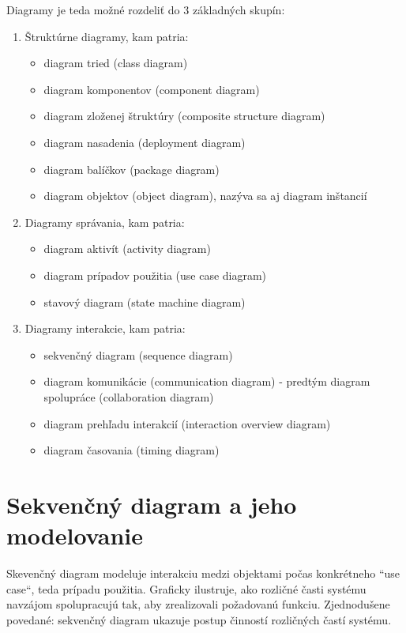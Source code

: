 \documentclass[10pt,twoside,slovak,a4paper]{article}
\begin{document}
 Diagramy je teda možné rozdeliť do 3 základných skupín\cite{WIKI}:

\begin{enumerate}
\item Štruktúrne diagramy, kam patria:
	\begin{itemize}
	\item diagram tried (class diagram)
	\item diagram komponentov (component diagram)
	\item diagram zloženej štruktúry (composite structure diagram)
	\item diagram nasadenia (deployment diagram)
	\item diagram balíčkov (package diagram)
	\item diagram objektov (object diagram), nazýva sa aj diagram inštancií
	\end{itemize}
\item Diagramy správania, kam patria:
	\begin{itemize}
	\item diagram aktivít (activity diagram)
	\item diagram prípadov použitia (use case diagram)
	\item stavový diagram (state machine diagram)
	\end{itemize}
\newpage
\item Diagramy interakcie, kam patria:
	\begin{itemize}
	\item sekvenčný diagram (sequence diagram)
	\item diagram komunikácie (communication diagram) - predtým diagram spolupráce (collaboration diagram)
	\item diagram prehľadu interakcií (interaction overview diagram)
	\item diagram časovania (timing diagram)
	\end{itemize}
\end{enumerate}



\section{Sekvenčný diagram a jeho modelovanie} \label{3sek}

Skevenčný diagram modeluje interakciu medzi objektami počas konkrétneho ``use case“, teda prípadu použitia. Graficky ilustruje, ako rozličné časti systému navzájom spolupracujú tak, aby zrealizovali požadovanú funkciu. Zjednodušene povedané: sekvenčný diagram ukazuje postup činností rozličných častí systému\cite{SDT}.\newline
\end{document}
